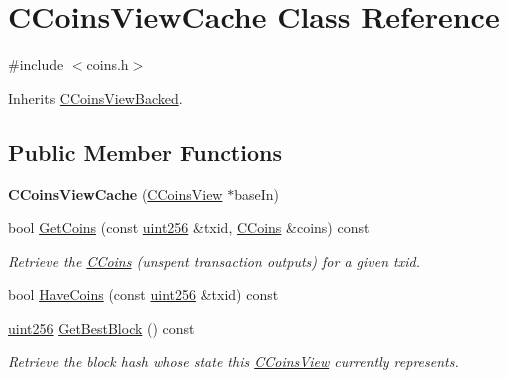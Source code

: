 \hypertarget{class_c_coins_view_cache}{}\section{C\+Coins\+View\+Cache Class Reference}
\label{class_c_coins_view_cache}


{\ttfamily \#include $<$coins.\+h$>$}



Inherits \mbox{\hyperlink{class_c_coins_view_backed}{C\+Coins\+View\+Backed}}.

\subsection*{Public Member Functions}
\begin{DoxyCompactItemize}
\item 
\mbox{\label{class_c_coins_view_cache_a515a6f259af607fb3394b560d9c063c9}} 
{\bfseries C\+Coins\+View\+Cache} (\mbox{\hyperlink{class_c_coins_view}{C\+Coins\+View}} $\ast$base\+In)
\item 
\mbox{\label{class_c_coins_view_cache_a1b62444593fdb580bfa4bd6fab41fafa}} 
bool \mbox{\hyperlink{class_c_coins_view_cache_a1b62444593fdb580bfa4bd6fab41fafa}{Get\+Coins}} (const \mbox{\hyperlink{classuint256}{uint256}} \&txid, \mbox{\hyperlink{class_c_coins}{C\+Coins}} \&coins) const
\begin{DoxyCompactList}\small\item\em Retrieve the \mbox{\hyperlink{class_c_coins}{C\+Coins}} (unspent transaction outputs) for a given txid. \end{DoxyCompactList}\item 
bool \mbox{\hyperlink{class_c_coins_view_cache_aa8f0c55b6fc207d2188948a565125ab7}{Have\+Coins}} (const \mbox{\hyperlink{classuint256}{uint256}} \&txid) const
\item 
\mbox{\label{class_c_coins_view_cache_a1190c94a943c067d13211179ef06470b}} 
\mbox{\hyperlink{classuint256}{uint256}} \mbox{\hyperlink{class_c_coins_view_cache_a1190c94a943c067d13211179ef06470b}{Get\+Best\+Block}} () const
\begin{DoxyCompactList}\small\item\em Retrieve the block hash whose state this \mbox{\hyperlink{class_c_coins_view}{C\+Coins\+View}} currently represents. \end{DoxyCompactList}\item 

\end{DoxyCompactItemize}
